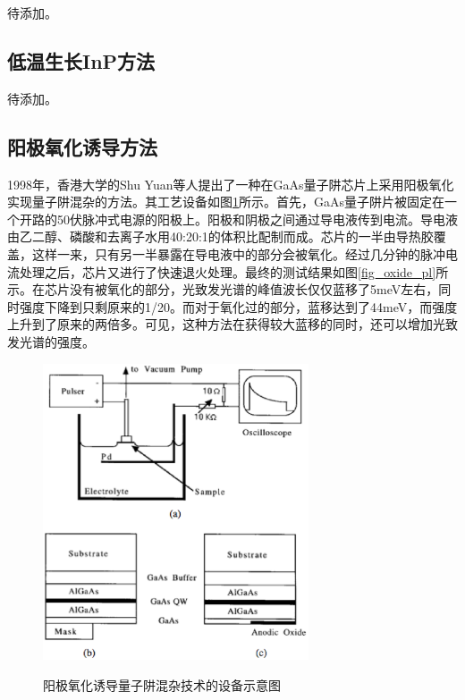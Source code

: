 \documentclass[oneside]{ZJUthesis}
\begin{document}
待添加。

\subsection{低温生长InP方法}
待添加。

\subsection{阳极氧化诱导方法}

1998年，香港大学的Shu Yuan等人提出了一种在GaAs量子阱芯片上采用阳极氧化实现量子阱混杂的方法\cite{yuan1998anodic}\cite{yuan1998anodicJSTQE}。其工艺设备如图\ref{fig_oxide}所示。首先，GaAs量子阱片被固定在一个开路的50伏脉冲式电源的阳极上。阳极和阴极之间通过导电液传到电流。导电液由乙二醇、磷酸和去离子水用40:20:1的体积比配制而成。芯片的一半由导热胶覆盖，这样一来，只有另一半暴露在导电液中的部分会被氧化。经过几分钟的脉冲电流处理之后，芯片又进行了快速退火处理。最终的测试结果如图\ref{fig_oxide_pl}所示。在芯片没有被氧化的部分，光致发光谱的峰值波长仅仅蓝移了5meV左右，同时强度下降到只剩原来的1/20。而对于氧化过的部分，蓝移达到了44meV，而强度上升到了原来的两倍多。可见，这种方法在获得较大蓝移的同时，还可以增加光致发光谱的强度。

\begin{figure}[!h]
  \centering
  \includegraphics[width=0.7\textwidth]{./Pictures/oxide.eps}\\
  \caption{阳极氧化诱导量子阱混杂技术的设备示意图}
  \label{fig_oxide}
\end{figure}
\end{document}
